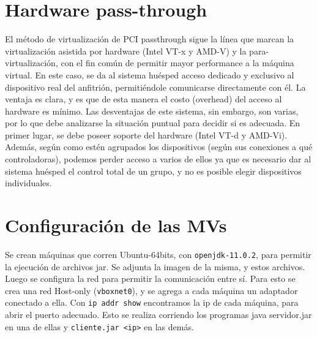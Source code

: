 
\section{Hardware pass-through}
El método de virtualización de PCI passthrough sigue la línea que marcan la virtualización asistida por hardware (Intel VT-x y AMD-V) y la para-virtualización, con el fin común de permitir mayor performance a la máquina virtual.
En este caso, se da al sistema huésped acceso dedicado y exclusivo al dispositivo real del anfitrión, permitiéndole comunicarse directamente con él. La ventaja es clara, y es que de esta manera el costo (overhead) del acceso al hardware es mínimo.
Las desventajas de este sistema, sin embargo, son varias, por lo que debe analizarse la situación puntual para decidir si es adecuada. En primer lugar, se debe poseer soporte del hardware (Intel VT-d y AMD-Vi). Además, según como estén agrupados los dispositivos (según sus conexiones a qué controladoras), podemos perder acceso a varios de ellos ya que es necesario dar al sistema huésped el control total de un grupo, y no es posible elegir dispositivos individuales.

\section{Configuración de las MVs}
Se crean máquinas que corren Ubuntu-64bits, con \texttt{openjdk-11.0.2}, para permitir la ejecución de archivos jar. Se adjunta la imagen de la misma, y estos archivos.
Luego se configura la red para permitir la comunicación entre sí. Para esto se crea una red Host-only (\texttt{vboxnet0}), y se agrega a cada máquina un adaptador conectado a ella. Con \texttt{ip addr show} encontramos la ip de cada máquina, para abrir el puerto adecuado. Esto se realiza corriendo los programas java servidor.jar en una de ellas y \texttt{cliente.jar <ip>} en las demás.

